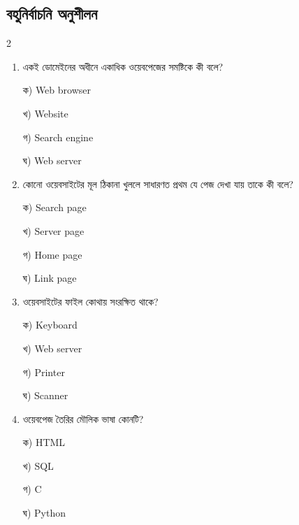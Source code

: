 \subsection{বহুনির্বাচনি অনুশীলন}

\begin{multicols}{2}
\begin{enumerate}[leftmargin=*,itemsep=5pt]
\item \begin{minipage}[t]{\linewidth}\vspace{0pt}
একই ডোমেইনের অধীনে একাধিক ওয়েবপেজের সমষ্টিকে কী বলে?
\par ক) Web browser
\par খ) Website
\par গ) Search engine
\par ঘ) Web server\\
\end{minipage}

\item \begin{minipage}[t]{\linewidth}\vspace{0pt}
কোনো ওয়েবসাইটের মূল ঠিকানা খুললে সাধারণত প্রথম যে পেজ দেখা যায় তাকে কী বলে?
\par ক) Search page
\par খ) Server page
\par গ) Home page
\par ঘ) Link page\\
\end{minipage}

\item \begin{minipage}[t]{\linewidth}\vspace{0pt}
ওয়েবসাইটের ফাইল কোথায় সংরক্ষিত থাকে?
\par ক) Keyboard
\par খ) Web server
\par গ) Printer
\par ঘ) Scanner\\
\end{minipage}

\item \begin{minipage}[t]{\linewidth}\vspace{0pt}
ওয়েবপেজ তৈরির মৌলিক ভাষা কোনটি?
\par ক) HTML
\par খ) SQL
\par গ) C
\par ঘ) Python\\
\end{minipage}


\end{enumerate}
\end{multicols}
